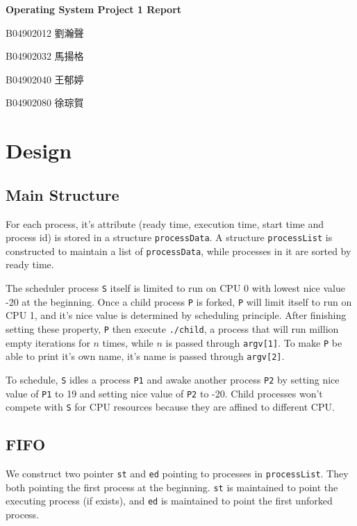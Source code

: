 \documentclass{article}
\begin{document}
\fontsize{12pt}{20pt}\selectfont
\begin{center}
	\bfseries\huge{Operating System Project 1 Report}\\
\end{center}
{
    \hfill B04902012 劉瀚聲

    \hfill B04902032 馬揚格

    \hfill B04902040 王郁婷

    \hfill B04902080 徐琮賀\\
}
\section{Design}
    \subsection{Main Structure}

        For each process, it's attribute (ready time, execution time, start time and process id) is stored in a structure {\tt processData}.
        A structure {\tt processList} is constructed to maintain a list of {\tt processData}, while processes in it are sorted by ready time.

        The scheduler process {\tt S} itself is limited to run on CPU 0 with lowest nice value -20 at the beginning. Once a child process {\tt P} is forked, {\tt P} will limit itself to run on CPU 1, and it's nice value is determined by scheduling principle. After finishing setting these property, {\tt P} then execute {\tt ./child}, a process that will run million empty iterations for \(n\) times, while \(n\) is passed through {\tt argv[1]}. To make {\tt P} be able to print it's own name, it's name is passed through {\tt argv[2]}.


        To schedule, {\tt S} idles a process {\tt P1} and awake another process {\tt P2} by setting nice value of {\tt P1}  to 19 and setting nice value of {\tt P2} to -20. Child processes won't compete with {\tt S} for CPU resources because they are affined to different CPU.
    
    \subsection{FIFO}
        We construct two pointer {\tt st} and {\tt ed} pointing to processes in {\tt processList}. They both pointing the first process at the beginning. {\tt st} is maintained to point the executing process (if exists), and {\tt ed} is maintained to point the first unforked process.
        
\end{document}
